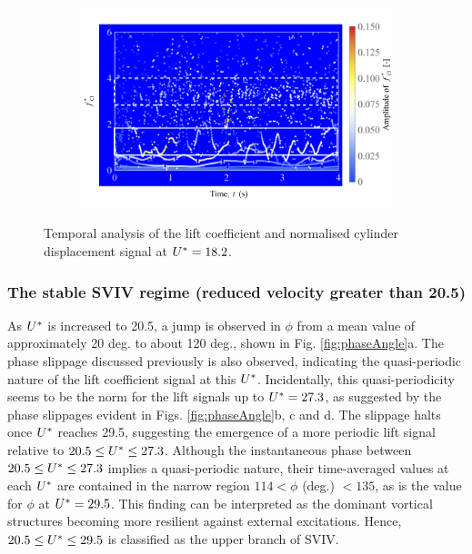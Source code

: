 \documentclass[oneside]{utmthesis}
\begin{document}
\begin{figure} \continuedfloat
  \centering
  \begin{subfigure}[h]{1\textwidth}
    \includegraphics[width=\textwidth]{figs/tempAnalysisStableInitialBranch-c}
    \caption{}
    \label{fig:tempAnalysisStableInitialBranch-c}
  \end{subfigure}
  \caption{Temporal analysis of the lift coefficient and normalised cylinder displacement signal at $U^{*} = 18.2$.}
  \label{fig:tempAnalysisStableInitialBranch}
\end{figure}

\subsubsection{The stable SVIV regime (reduced velocity greater than 20.5)} \label{sssec:svivRegime}
As $U^{*}$ is increased to 20.5, a jump is observed in $\phi$ from a mean value of approximately 20 deg. to about 120 deg., shown in Fig. \ref{fig:phaseAngle}a. The phase slippage discussed previously is also observed, indicating the quasi-periodic nature of the lift coefficient signal at this $U^{*}$. Incidentally, this quasi-periodicity seems to be the norm for the lift signals up to $U^{*} = 27.3$, as suggested by the phase slippages evident in Figs. \ref{fig:phaseAngle}b, c and d. The slippage halts once $U^{*}$ reaches 29.5, suggesting the emergence of a more periodic lift signal relative to $20.5 \leq U^{*} \leq 27.3$. Although the instantaneous phase between $20.5 \leq U^{*} \leq 27.3$ implies a quasi-periodic nature, their time-averaged values at each $U^{*}$ are contained in the narrow region $114 < \phi$ (deg.) $< 135$, as is the value for $\phi$ at $U^{*} = 29.5$. This finding can be interpreted as the dominant vortical structures becoming more resilient against external excitations. Hence, $20.5 \leq U^{*} \leq 29.5$ is classified as the upper branch of SVIV.
\end{document}
